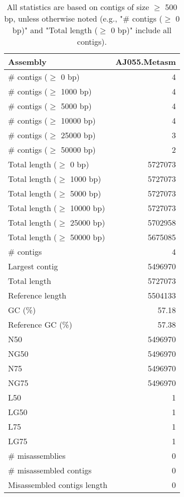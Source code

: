 \documentclass[12pt,a4paper]{article}
\begin{document}
\begin{table}[ht]
\begin{center}
\caption{All statistics are based on contigs of size $\geq$ 500 bp, unless otherwise noted (e.g., "\# contigs ($\geq$ 0 bp)" and "Total length ($\geq$ 0 bp)" include all contigs).}
\begin{tabular}{|l*{1}{|r}|}
\hline
Assembly & AJ055.Metasm \\ \hline
\# contigs ($\geq$ 0 bp) & 4 \\ \hline
\# contigs ($\geq$ 1000 bp) & 4 \\ \hline
\# contigs ($\geq$ 5000 bp) & 4 \\ \hline
\# contigs ($\geq$ 10000 bp) & 4 \\ \hline
\# contigs ($\geq$ 25000 bp) & 3 \\ \hline
\# contigs ($\geq$ 50000 bp) & 2 \\ \hline
Total length ($\geq$ 0 bp) & 5727073 \\ \hline
Total length ($\geq$ 1000 bp) & 5727073 \\ \hline
Total length ($\geq$ 5000 bp) & 5727073 \\ \hline
Total length ($\geq$ 10000 bp) & 5727073 \\ \hline
Total length ($\geq$ 25000 bp) & 5702958 \\ \hline
Total length ($\geq$ 50000 bp) & 5675085 \\ \hline
\# contigs & 4 \\ \hline
Largest contig & 5496970 \\ \hline
Total length & 5727073 \\ \hline
Reference length & 5504133 \\ \hline
GC (\%) & 57.18 \\ \hline
Reference GC (\%) & 57.38 \\ \hline
N50 & 5496970 \\ \hline
NG50 & 5496970 \\ \hline
N75 & 5496970 \\ \hline
NG75 & 5496970 \\ \hline
L50 & 1 \\ \hline
LG50 & 1 \\ \hline
L75 & 1 \\ \hline
LG75 & 1 \\ \hline
\# misassemblies & 0 \\ \hline
\# misassembled contigs & 0 \\ \hline
Misassembled contigs length & 0 \\ \hline

\end{tabular}
\end{center}
\end{table}
\end{document}
